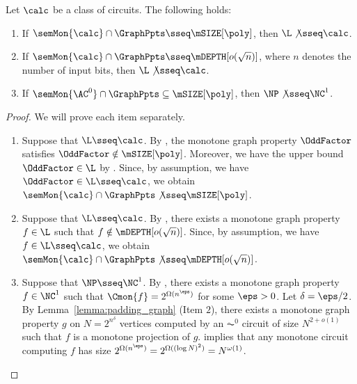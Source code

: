 \documentclass[11pt]{article}
\begin{document}
\begin{theorem}
    \label{cor:matching-ag}
    Let $\calc$ be 
    a class of circuits.
    The following holds:
    \begin{enumerate}
        \item 
            \label{item:gpsize}
            If $\semMon{\calc} \cap \GraphPpts \sseq \mSIZE[\poly]$,
            then 
            $\L
            \not\sseq
            \calc$.
        \item 
            \label{item:gpdepth}
            If 
            $\semMon{\calc} \cap \GraphPpts \sseq 
            \mDEPTH[o(\sqrt{n})]$, where $n$ denotes the number of input bits,
            then
            $\L
            \not\sseq
            \calc$.
        \item 
            \label{item:kclq}
            If 
            $\semMon{\AC^0} \cap \GraphPpts \subseteq \mSIZE[\poly]$,
            then $\NP \not\sseq \NC^1$.
    \end{enumerate}
\end{theorem}
\begin{proof}
    We will prove each item separately.

    \begin{enumerate}[label=\emph{Proof of (\arabic*)}., leftmargin=*]
        \item 
            Suppose that $\L \sseq \calc$.
            By ,
            the monotone graph property 
            $\OddFactor$
            satisfies
            $\OddFactor \notin \mSIZE[\poly]$.
            Moreover, we have the upper bound $\OddFactor \in \L$ by
            .
            Since, by assumption, we have $\OddFactor \in \L \sseq \calc$,
            we obtain
            $\semMon{\calc} \cap \GraphPpts \not\sseq \mSIZE[\poly]$.
        \item 
            Suppose that $\L \sseq \calc$.
            By 
            , 
            there exists a monotone graph property $f \in \L$ such
            that $f \notin \mDEPTH[o(\sqrt{n})]$.
            Since, by assumption, we have
            $f \in \L \sseq \calc$,
            we obtain
            $\semMon{\calc} \cap \GraphPpts \not\sseq \mDEPTH[o(\sqrt{n})]$.

        \item 
            Suppose that $\NP \sseq \NC^1$.
            By , there exists a monotone graph property
            $f \in \NC^1$ such that
            $\Cmon{f} = 2^{\Omega(n^\eps)}$ for some $\eps > 0$.
            Let $\delta = \eps/2$.
            By Lemma~\ref{lemma:padding_graph} (Item $2$),
            there exists a monotone graph property $g$ on
            $N = 2^{n^\delta}$ vertices
            computed by
            an $\AC^0$ circuit of size $N^{2+o(1)}$
            such that $f$ is a monotone projection of $g$.
            implies that 
            any monotone circuit computing $f$ has size
            $2^{\Omega(n^{\eps})} 
            = 2^{\Omega((\log N)^2)} = N^{\omega(1)}$.
            \qedhere
    \end{enumerate}
\end{proof}
\end{document}
